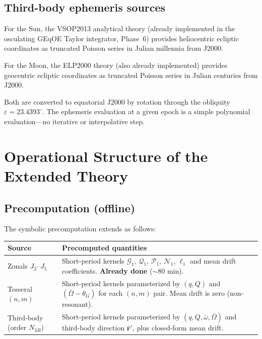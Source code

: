 \documentclass[11pt]{article}
\begin{document}
\subsection{Third-body ephemeris sources}

For the Sun, the VSOP2013 analytical theory (already implemented in the
osculating GEqOE Taylor integrator, Phase~6) provides heliocentric ecliptic
coordinates as truncated Poisson series in Julian millennia from J2000.

For the Moon, the ELP2000 theory (also already implemented) provides
geocentric ecliptic coordinates as truncated Poisson series in Julian
centuries from J2000.

Both are converted to equatorial J2000 by rotation through the obliquity
$\varepsilon = 23.4393^\circ$. The ephemeris evaluation at a given epoch
is a simple polynomial evaluation---no iterative or interpolative step.


\section{Operational Structure of the Extended Theory}
\label{sec:operational}

\subsection{Precomputation (offline)}

The symbolic precomputation extends as follows:

\begin{center}
\begin{tabular}{lp{8cm}}
\toprule
Source & Precomputed quantities \\
\midrule
Zonals $J_2$--$J_5$ &
Short-period kernels $\mathcal G_1$, $\mathcal Q_1$,
$\mathcal P_1$, $\mathcal N_1$, $\ell_1$
and mean drift coefficients.
\textbf{Already done} ($\sim$80 min). \\
\addlinespace
Tesseral $(n,m)$ &
Short-period kernels parameterized by $(q, Q)$ and
$(\bar\Omega - \theta_G)$ for each $(n,m)$ pair.
Mean drift is zero (non-resonant).
\\
\addlinespace
Third-body (order $N_{3B}$) &
Short-period kernels parameterized by $(q, Q, \bar\omega,
\bar\Omega)$ and third-body direction $\hat{\bm r}'$,
plus closed-form mean drift.
\\
\bottomrule
\end{tabular}
\end{center}
\end{document}
